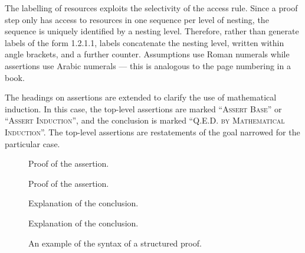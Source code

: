 \documentclass[11pt,a4paper,oneside,titlepage]{alb-latex}
\begin{document}
The labelling of resources exploits the selectivity of the access rule.
Since a proof step only has access to resources in one sequence per
level of nesting, the sequence is uniquely identified by a nesting
level.  Therefore, rather than generate labels of the form 1.2.1.1,
labels concatenate the nesting level, written within angle brackets, and
a further counter.  Assumptions use Roman numerals while assertions use
Arabic numerals --- this is analogous to the page numbering in a book.

The headings on assertions are extended to clarify the use of
mathematical induction.  In this case, the top-level assertions are
marked ``\textsc{Assert Base}'' or ``\textsc{Assert Induction}'', and
the conclusion is marked ``\textsc{Q.E.D. by Mathematical Induction}''.
The top-level assertions are restatements of the goal narrowed for the
particular case.

\begin{figure}
  \begin{albProof}
    \begin{albAssumptions}
    \item \label{as:intr:1} %

    \item \label{as:intr:2} %
    \end{albAssumptions}

    \begin{albAssertions}
    \item \label{pf:intr:1} %

      Proof of the assertion.

    \item \label{pf:intr:2} %

      \begin{albAssumptions}
      \item \label{as:intr:3} %
      \end{albAssumptions}

      \begin{albAssertions}
      \item \label{pf:intr:3} %

        Proof of the assertion.

      \item %
        \albQED{}

        Explanation of the conclusion.
      \end{albAssertions}

    \item %
      \albQED{}

      Explanation of the conclusion.
    \end{albAssertions}
  \end{albProof}
  \caption[An example of the syntax of a structured proof]{%
    An example of the syntax of a structured proof.}
  \label{fig:alb-proofs-documentation:example-syntax-struct-pro}
\end{figure}
\end{document}
